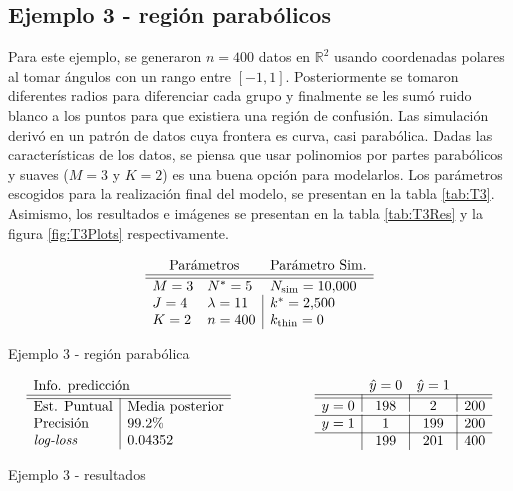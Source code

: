 \documentclass[../Main/Main.tex]{subfiles}
\begin{document}
\subsection*{Ejemplo 3 - región parabólicos}
Para este ejemplo, se generaron $n = 400$ datos en $\mathbb{R}^2$ usando coordenadas polares al tomar ángulos con un rango entre $[-1,1]$. Posteriormente se tomaron diferentes radios para diferenciar cada grupo y finalmente se les sumó ruido blanco a los puntos para que existiera una región de confusión. Las simulación derivó en un patrón de datos cuya frontera es curva, casi parabólica. Dadas las características de los datos, se piensa que usar polinomios por partes parabólicos y suaves ($M = 3$ y $K = 2$) es una buena opción para modelarlos. Los parámetros escogidos para la realización final del modelo, se presentan en la tabla \ref{tab:T3}. Asimismo, los resultados e imágenes se presentan en la tabla \ref{tab:T3Res} y la figura \ref{fig:T3Plots} respectivamente.

\begin{table}[h]
$$\paramsmod{3}{4}{2}{5}{11}{400}{\num{10000}}{\num{2500}}{0}$$
\caption{Ejemplo 3 - región parabólica}
\label{tab:T3}
\end{table}

\begin{table}[h]
\begin{align*}
\resultados{\text{Media posterior}}{99.2}{0.04352}
\qquad\qquad\qquad
\matconf{198}{2}{200}{1}{199}{200}{199}{201}{400}
\end{align*}
\caption{Ejemplo 3 - resultados}
\label{tab:T3Res}
\end{table}
\end{document}
